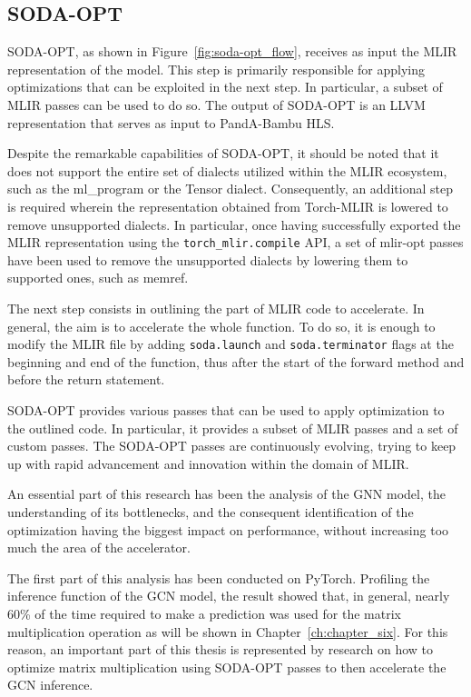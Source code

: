 \subsection{SODA-OPT}
\label{subsec:toolchain-soda_opt}%

SODA-OPT, as shown in Figure~\ref{fig:soda-opt_flow}, receives as input the MLIR representation of the model.
This step is primarily responsible for applying optimizations that can be exploited in the next step.
In particular, a subset of MLIR passes can be used to do so.
The output of SODA-OPT is an LLVM representation that serves as input to PandA-Bambu HLS\@.

Despite the remarkable capabilities of SODA-OPT, it should be noted that it does not support the entire set of dialects utilized within the MLIR ecosystem, such as the ml\_program or the Tensor dialect.
Consequently, an additional step is required wherein the representation obtained from Torch-MLIR is lowered to remove unsupported dialects.
In particular, once having successfully exported the MLIR representation using the \lstinline{torch_mlir.compile} API, a set of mlir-opt passes have been used to remove the unsupported dialects by lowering them to supported ones, such as memref.

The next step consists in outlining the part of MLIR code to accelerate.
In general, the aim is to accelerate the whole function.
To do so, it is enough to modify the MLIR file by adding \lstinline{soda.launch} and \lstinline{soda.terminator} flags at the beginning and end of the function, thus after the start of the forward method and before the return statement.

SODA-OPT provides various passes that can be used to apply optimization to the outlined code.
In particular, it provides a subset of MLIR passes and a set of custom passes.
The SODA-OPT passes are continuously evolving, trying to keep up with rapid advancement and innovation within the domain of MLIR\@.

An essential part of this research has been the analysis of the GNN model, the understanding of its bottlenecks, and the consequent identification of the optimization having the biggest impact on performance, without increasing too much the area of the accelerator.

The first part of this analysis has been conducted on PyTorch.
Profiling the inference function of the GCN model, the result showed that, in general, nearly 60\% of the time required to make a prediction was used for the matrix multiplication operation as will be shown in Chapter~\ref{ch:chapter_six}.
For this reason, an important part of this thesis is represented by research on how to optimize matrix multiplication using SODA-OPT passes to then accelerate the GCN inference.


